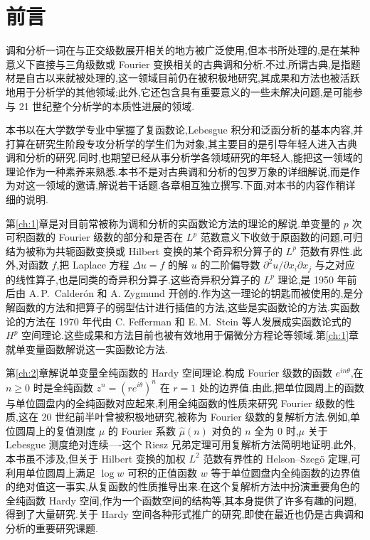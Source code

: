 \chapter*{前言}

调和分析一词在与正交级数展开相关的地方被广泛使用,但本书所处理的,是在某种意义下直接与三角级数或 Fourier 变换相关的古典调和分析.不过,所谓古典,是指题材是自古以来就被处理的,这一领域目前仍在被积极地研究,其成果和方法也被活跃地用于分析学的其他领域;此外,它还包含具有重要意义的一些未解决问题,是可能参与 21 世纪整个分析学的本质性进展的领域.

本书以在大学数学专业中掌握了复函数论,Lebesgue 积分和泛函分析的基本内容,并打算在研究生阶段专攻分析学的学生们为对象,其主要目的是引导年轻人进入古典调和分析的研究.同时,也期望已经从事分析学各领域研究的年轻人,能把这一领域的理论作为一种素养来熟悉.本书不是对古典调和分析的包罗万象的详细解说,而是作为对这一领域的邀请,解说若干话题.各章相互独立撰写.下面,对本书的内容作稍详细的说明.

第\ref{ch:1}章是对目前常被称为调和分析的实函数论方法的理论的解说.单变量的 $p$ 次可积函数的 Fourier 级数的部分和是否在 $L^{p}$ 范数意义下收敛于原函数的问题,可归结为被称为共轭函数变换或 Hilbert 变换的某个奇异积分算子的 $L^{p}$ 范数有界性.此外,对函数 $f$,把 Laplace 方程 $\Delta u = f$ 的解 $u$ 的二阶偏导数 $\partial^{2}u/\partial x_{i}\partial x_{j}$ 与之对应的线性算子,也是同类的奇异积分算子.这些奇异积分算子的 $L^{p}$ 理论,是 1950 年前后由 A.\,P.\ Calderón 和 A. Zygmund 开创的.作为这一理论的钥匙而被使用的,是分解函数的方法和把算子的弱型估计进行插值的方法,这些是实函数论的方法.实函数论的方法在 1970 年代由 C. Fefferman 和 E.\,M.\ Stein 等人发展成实函数论式的 $H^{p}$ 空间理论.这些成果和方法目前也被有效地用于偏微分方程论等领域.第\ref{ch:1}章就单变量函数解说这一实函数论方法.

第\ref{ch:2}章解说单变量全纯函数的 Hardy 空间理论.构成 Fourier 级数的函数 $e^{in\theta}$,在 $n \geq 0$ 时是全纯函数 $z^{n} = (re^{i\theta})^{n}$ 在 $r = 1$ 处的边界值.由此,把单位圆周上的函数与单位圆盘内的全纯函数对应起来,利用全纯函数的性质来研究 Fourier 级数的性质,这在 20 世纪前半叶曾被积极地研究,被称为 Fourier 级数的复解析方法.例如,单位圆周上的复值测度 $\mu$ 的 Fourier 系数 $\hat{\mu}(n)$ 对负的 $n$ 全为 0 时,$\mu$ 关于 Lebesgue 测度绝对连续----这个 Riesz 兄弟定理可用复解析方法简明地证明.此外,本书虽不涉及,但关于 Hilbert 变换的加权 $L^2$ 范数有界性的 Helson--Szeg\"o 定理,可利用单位圆周上满足 $\log w$ 可积的正值函数 $w$ 等于单位圆盘内全纯函数的边界值的绝对值这一事实,从复函数的性质推导出来.在这个复解析方法中扮演重要角色的全纯函数 Hardy 空间,作为一个函数空间的结构等,其本身提供了许多有趣的问题,得到了大量研究.关于 Hardy 空间各种形式推广的研究,即使在最近也仍是古典调和分析的重要研究课题.

